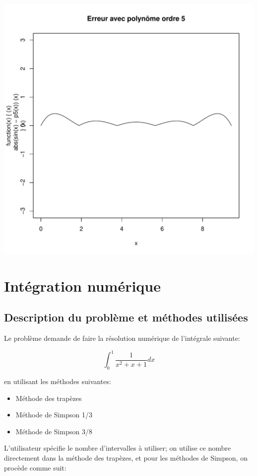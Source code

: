 \documentclass[10pt]{article}
\begin{document}
\includegraphics[scale=0.4]{data/p5}


\section{Intégration numérique}

\subsection{Description du problème et méthodes utilisées}

Le problème demande de faire la résolution numérique de l'intégrale
suivante:

\[
\int_0^1 \frac{1}{x^2 + x + 1}dx
\]

en utilisant les méthodes suivantes:

\begin{itemize}
\item Méthode des trapèzes
\item Méthode de Simpson 1/3
\item Méthode de Simpson 3/8
\end{itemize}

L'utilisateur spécifie le nombre d'intervalles à utiliser; on utilise
ce nombre directement dans la méthode des trapèzes, et pour les
méthodes de Simpson, on procède comme suit:
\end{document}
